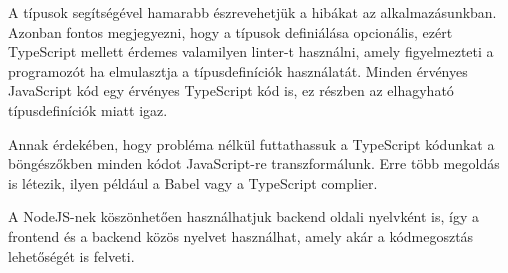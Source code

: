 A típusok segítségével hamarabb észrevehetjük a hibákat az alkalmazásunkban. Azonban fontos megjegyezni, hogy a típusok definiálása opcionális, ezért TypeScript mellett érdemes valamilyen linter-t használni, amely figyelmezteti a programozót ha elmulasztja a típusdefiníciók használatát. 
Minden érvényes JavaScript kód egy érvényes TypeScript kód is, ez részben az elhagyható típusdefiníciók miatt igaz.

Annak érdekében, hogy probléma nélkül futtathassuk a TypeScript kódunkat a böngészőkben minden kódot JavaScript-re transzformálunk. Erre több megoldás is létezik, ilyen például a Babel vagy a TypeScript complier.

A NodeJS-nek köszönhetően használhatjuk backend oldali nyelvként is, így a frontend és a backend közös nyelvet használhat, amely akár a kódmegosztás lehetőségét is felveti.
